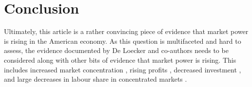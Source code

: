 \documentclass{amsart}
\theoremstyle{definition}
\theoremstyle{remark}
\numberwithin{equation}{section}
\begin{document}






\section*{Conclusion}

Ultimately, this article is a rather convincing piece of evidence that market power is rising in the American economy. As this question is multifaceted and hard to assess, the evidence documented by De Loecker and co-authors needs to be considered along with other bits of evidence that market power is rising. This includes increased market concentration \citep{autor2017concentrating}, rising profits \citep{barkai2019declining}, decreased investment \citep{gutierrez2017investment}, and large decreases in labour share in concentrated markets \citep{azar2017labor}.\\
\end{document}
